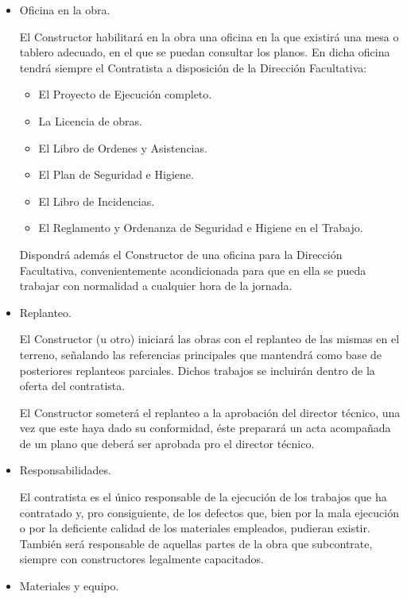 \documentclass[../main.tex]{subfiles}
\begin{document}
\begin{itemize}
    \item Oficina en la obra. \par
    \vspace{0.5 cm}
    El Constructor habilitará en la obra una oficina en la que existirá una mesa o tablero adecuado, en el que se puedan consultar los planos. En dicha oficina tendrá siempre el Contratista a disposición de la Dirección Facultativa:
    \begin{itemize}
        \item El Proyecto de Ejecución completo.
        \item La Licencia de obras.
        \item El Libro de Ordenes y Asistencias.
        \item El Plan de Seguridad e Higiene.
        \item El Libro de Incidencias.
        \item El Reglamento y Ordenanza de Seguridad e Higiene en el Trabajo.
    \end{itemize}
    Dispondrá además el Constructor de una oficina para la Dirección Facultativa, convenientemente acondicionada para que en ella se pueda trabajar con normalidad a cualquier hora de la jornada.
    \item Replanteo. \par
    \vspace{0.5 cm}
    El Constructor (u otro) iniciará las obras con el replanteo de las mismas en el terreno, señalando las referencias principales que mantendrá como base de posteriores replanteos parciales. Dichos trabajos se incluirán dentro de la oferta del contratista. \par
    \vspace{0.5 cm}
    El Constructor someterá el replanteo a la aprobación del director técnico, una vez que este haya dado su conformidad, éste preparará un acta acompañada de un plano que deberá ser aprobada pro el director técnico.
    \item Responsabilidades. \par
    \vspace{0.5 cm}
    El contratista es el único responsable de la ejecución de los trabajos que ha contratado y, pro consiguiente, de los defectos que, bien por la mala ejecución o por la deficiente calidad de los materiales empleados, pudieran existir. También será responsable de aquellas partes de la obra que subcontrate, siempre con constructores legalmente capacitados.
    \item Materiales y equipo. \par

\end{itemize}
\end{document}
